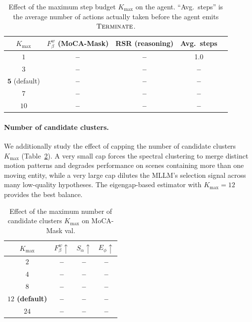 \documentclass[11pt]{article}
\newcommand{\TBD}{\textcolor{red!70!black}{\textbf{--}}}
\begin{document}
\begin{table}[t]
\centering
\caption{Effect of the maximum step budget $K_{\max}$ on the agent. ``Avg.\ steps'' is the average number of actions actually taken before the agent emits $\textsc{Terminate}$.}
\label{tab:abl-kmax}
\small
\begin{tabular}{ccccc}
\toprule
$K_{\max}$ & $F^w_\beta$ (MoCA-Mask) & RSR (reasoning) & Avg.\ steps \\
\midrule
$1$           & \TBD & \TBD & 1.0  \\
$3$           & \TBD & \TBD & \TBD \\
$\mathbf{5}$ (default) & \TBD & \TBD & \TBD \\
$7$           & \TBD & \TBD & \TBD \\
$10$          & \TBD & \TBD & \TBD \\
\bottomrule
\end{tabular}
\end{table}

\paragraph{Number of candidate clusters.}
We additionally study the effect of capping the number of candidate clusters $K_{\max}$ (Table~\ref{tab:k}).
A very small cap forces the spectral clustering to merge distinct motion patterns and degrades performance on scenes containing more than one moving entity, while a very large cap dilutes the MLLM's selection signal across many low-quality hypotheses.
The eigengap-based estimator with $K_{\max}{=}12$ provides the best balance.

\begin{table}[t]
\centering
\caption{Effect of the maximum number of candidate clusters $K_{\max}$ on MoCA-Mask val.}
\label{tab:k}
\small
\begin{tabular}{cccc}
\toprule
$K_{\max}$ & $F^w_\beta\uparrow$ & $S_\alpha\uparrow$ & $E_\phi\uparrow$ \\
\midrule
$2$   & \TBD & \TBD & \TBD \\
$4$   & \TBD & \TBD & \TBD \\
$8$   & \TBD & \TBD & \TBD \\
\textbf{$12$ (default)} & \TBD & \TBD & \TBD \\
$24$  & \TBD & \TBD & \TBD \\
\bottomrule
\end{tabular}
\end{table}
\end{document}
